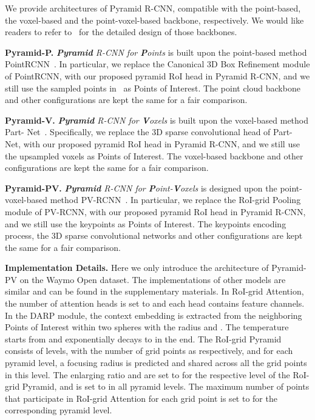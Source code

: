 \documentclass[10pt,twocolumn,letterpaper]{article}
\begin{document}
We provide  architectures of Pyramid R-CNN, compatible with the point-based, the voxel-based and the point-voxel-based backbone, respectively. We would like readers to refer to~\cite{openpcdet} for the detailed design of those backbones. 

\noindent\textbf{Pyramid-P.} \textit{\textbf{Pyramid} R-CNN for \textbf{P}oints} is built upon the point-based method PointRCNN~\cite{shi2019pointrcnn}. In particular, we replace the Canonical 3D Box Refinement module of PointRCNN, with our proposed pyramid RoI head in Pyramid R-CNN, and we still use the sampled points in~\cite{shi2019pointrcnn} as Points of Interest. The point cloud backbone and other configurations are kept the same for a fair comparison.

\noindent\textbf{Pyramid-V.} \textit{\textbf{Pyramid} R-CNN for \textbf{V}oxels} is built upon the voxel-based method Part- Net~\cite{shi2020points}. Specifically, we replace the 3D sparse convolutional head of Part- Net, with our proposed pyramid RoI head in Pyramid R-CNN, and we still use the upsampled voxels as Points of Interest. The voxel-based backbone and other configurations are kept the same for a fair comparison.

\noindent\textbf{Pyramid-PV.} \textit{\textbf{Pyramid} R-CNN for \textbf{P}oint-\textbf{V}oxels} is designed upon the point-voxel-based method PV-RCNN~\cite{shi2020pv}. In particular, we replace the RoI-grid Pooling module of PV-RCNN, with our proposed pyramid RoI head in Pyramid R-CNN, and we still use the keypoints as Points of Interest. The keypoints encoding process, the 3D sparse convolutional networks and other configurations are kept the same for a fair comparison.

\noindent\textbf{Implementation Details.} Here we only introduce the architecture of Pyramid-PV on the Waymo Open dataset. The implementations of other models are similar and can be found in the supplementary materials. In RoI-grid Attention, the number of attention heads is set to  and each head contains  feature channels. In the DARP module, the context embedding is extracted from the neighboring Points of Interest within two spheres with the radius  and . The temperature  starts from  and exponentially decays to  in the end. The RoI-grid Pyramid consists of  levels, with the number of grid points as  respectively, and for each pyramid level, a focusing radius  is predicted and shared across all the grid points in this level. The enlarging ratio  and  are set to  for the respective level of the RoI-grid Pyramid, and  is set to  in all pyramid levels. The maximum number of points that participate in RoI-grid Attention for each grid point is set to  for the corresponding pyramid level.
\end{document}
